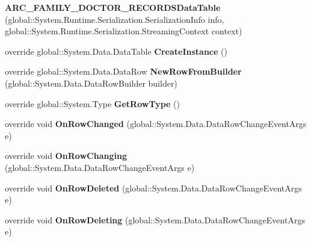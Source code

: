 \begin{CompactItemize}
\item 
\textbf{ARC\_\-FAMILY\_\-DOCTOR\_\-RECORDSDataTable} (global::System.Runtime.Serialization.SerializationInfo info, global::System.Runtime.Serialization.StreamingContext context)\label{class_automatic_medical_system_1_1_data_set1_1_1_a_r_c___f_a_m_i_l_y___d_o_c_t_o_r___r_e_c_o_r_d_s_data_table_cdfa672420937c3dbcaaf190f2ab7f35}

\item 
override global::System.Data.DataTable \textbf{CreateInstance} ()\label{class_automatic_medical_system_1_1_data_set1_1_1_a_r_c___f_a_m_i_l_y___d_o_c_t_o_r___r_e_c_o_r_d_s_data_table_edb7d464b470b8e0a20dbb278a47ba7b}

\item 
override global::System.Data.DataRow \textbf{NewRowFromBuilder} (global::System.Data.DataRowBuilder builder)\label{class_automatic_medical_system_1_1_data_set1_1_1_a_r_c___f_a_m_i_l_y___d_o_c_t_o_r___r_e_c_o_r_d_s_data_table_aad28b666470f01c5a2f6a0a270cd509}

\item 
override global::System.Type \textbf{GetRowType} ()\label{class_automatic_medical_system_1_1_data_set1_1_1_a_r_c___f_a_m_i_l_y___d_o_c_t_o_r___r_e_c_o_r_d_s_data_table_a7f5f23bad321a44cb43eb9dedc12b10}

\item 
override void \textbf{OnRowChanged} (global::System.Data.DataRowChangeEventArgs e)\label{class_automatic_medical_system_1_1_data_set1_1_1_a_r_c___f_a_m_i_l_y___d_o_c_t_o_r___r_e_c_o_r_d_s_data_table_7308df9fefabff3ad761eb087cb34f1d}

\item 
override void \textbf{OnRowChanging} (global::System.Data.DataRowChangeEventArgs e)\label{class_automatic_medical_system_1_1_data_set1_1_1_a_r_c___f_a_m_i_l_y___d_o_c_t_o_r___r_e_c_o_r_d_s_data_table_da5cf71f8e1a9a89bb9102232fc198c8}

\item 
override void \textbf{OnRowDeleted} (global::System.Data.DataRowChangeEventArgs e)\label{class_automatic_medical_system_1_1_data_set1_1_1_a_r_c___f_a_m_i_l_y___d_o_c_t_o_r___r_e_c_o_r_d_s_data_table_279df9d491fa4a9e9bcdbd8ba160ff5d}

\item 
override void \textbf{OnRowDeleting} (global::System.Data.DataRowChangeEventArgs e)\label{class_automatic_medical_system_1_1_data_set1_1_1_a_r_c___f_a_m_i_l_y___d_o_c_t_o_r___r_e_c_o_r_d_s_data_table_b19b6329bc2487787d37be012272ae8d}

\end{CompactItemize}
